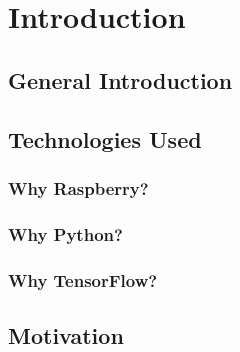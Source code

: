 \chapter{Introduction}
\label{introduction}

\section{General Introduction}
\section{Technologies Used}	%
\subsection{Why Raspberry?}
\subsection{Why Python?}
\subsection{Why TensorFlow?}
\section{Motivation}
